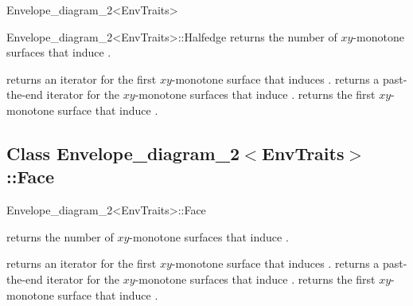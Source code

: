\begin{ccRefClass}{Envelope_diagram_2<EnvTraits>}
\begin{ccClass}{Envelope_diagram_2<EnvTraits>::Halfedge}
{returns the number of $xy$-monotone surfaces that induce \ccVar.}

{returns an iterator for the first $xy$-monotone surface that induces \ccVar.}
\ccGlue
{}
{returns a past-the-end iterator for the $xy$-monotone surfaces that induce
 \ccVar.}
{returns the first $xy$-monotone surface that induce \ccVar.
 }

\end{ccClass}


\subsection*{Class Envelope\_diagram\_2$<$EnvTraits$>$::Face}

\begin{ccClass}{Envelope_diagram_2<EnvTraits>::Face}

\ccInheritsFrom

\ccAccessFunctions

{returns the number of $xy$-monotone surfaces that induce \ccVar.}

{returns an iterator for the first $xy$-monotone surface that induces \ccVar.}
\ccGlue
{}
{returns a past-the-end iterator for the $xy$-monotone surfaces that induce
 \ccVar.}
{returns the first $xy$-monotone surface that induce \ccVar.
 }

\end{ccClass}


\end{ccRefClass}

\ccRefPageEnd

